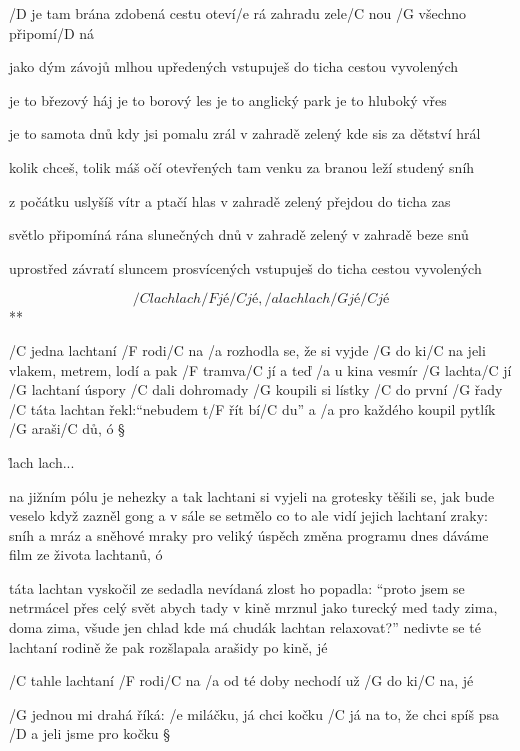 /D je tam brána zdobená
cestu oteví/e rá
zahradu zele/C nou
/G všechno připomí/D ná \s

jako dým závojů
mlhou upředených
vstupuješ do ticha
cestou vyvolených \s

je to březový háj
je to borový les
je to anglický park
je to hluboký vřes \s

je to samota dnů
kdy jsi pomalu zrál
v zahradě zelený
kde sis za dětství hrál \s

kolik chceš, tolik máš
očí otevřených
tam venku za branou
leží studený sníh \s

z počátku uslyšíš
vítr a ptačí hlas
v zahradě zelený
přejdou do ticha zas \s

světlo připomíná
rána slunečných dnů
v zahradě zelený
v zahradě beze snů \s

uprostřed závratí
sluncem prosvícených
vstupuješ do ticha
cestou vyvolených




\R  \[ /C lach lach /F jé /C jé, /a lach lach /G jé /C jé \] **

/C jedna lachtaní /F rodi/C na
/a rozhodla se, že si vyjde /G do ki/C na
jeli vlakem, metrem, lodí a pak /F tramva/C jí
a teď /a u kina vesmír /G lachta/C jí
/G lachtaní úspory /C dali dohromady
/G koupili si lístky /C do první /G řady
/C táta lachtan řekl:``nebudem t/F řít bí/C du''
a /a pro každého koupil pytlík /G araši/C dů, ó \S

\r  lach lach...

na jižním pólu je nehezky
a tak lachtani si vyjeli na grotesky
těšili se, jak bude veselo
když zazněl gong a v sále se setmělo
co to ale vidí jejich lachtaní zraky:
sníh a mráz a sněhové mraky
pro veliký úspěch změna programu
dnes dáváme film ze života lachtanů, ó

\rr

táta lachtan vyskočil ze sedadla
nevídaná zlost ho popadla:
``proto jsem se netrmácel přes celý svět
abych tady v kině mrznul jako turecký med
tady zima, doma zima, všude jen chlad
kde má chudák lachtan relaxovat?''
nedivte se té lachtaní rodině
že pak rozšlapala arašidy po kině, jé

\rr

/C tahle lachtaní /F rodi/C na
/a od té doby nechodí už /G do ki/C na, jé




/G jednou mi drahá říká: /e miláčku, já chci kočku
/C já na to, že chci spíš psa /D a jeli jsme pro kočku \S

